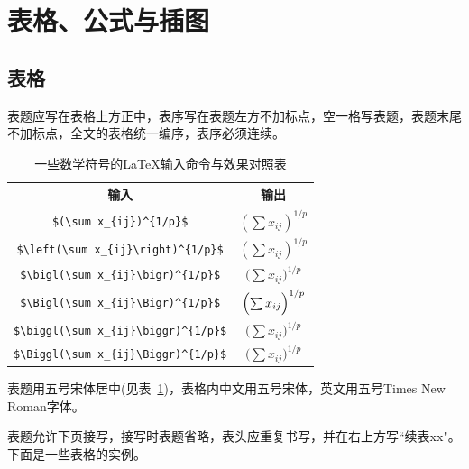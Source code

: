 \section{表格、公式与插图}\label{sec:ssss}
\subsection{表格}



表题应写在表格上方正中，表序写在表题左方不加标点，空一格写表题，表题末尾不加标点，全文的表格统一编序，表序必须连续。
\begin{table}[h]
  \centering
  \caption{一些数学符号的{\LaTeX}输入命令与效果对照表}\label{table:1}
  \begin{tabular}{|c|c|}\hline
  输入 & 输出 \\\hline
  \verb=$(\sum x_{ij})^{1/p}$= & $(\sum x_{ij})^{1/p}$ \\\hline
  \verb=$\left(\sum x_{ij}\right)^{1/p}$= & $\left(\sum x_{ij}\right)^{1/p}$ \\\hline
  \verb=$\bigl(\sum x_{ij}\bigr)^{1/p}$= & $\bigl(\sum x_{ij}\bigr)^{1/p}$ \\\hline
  \verb=$\Bigl(\sum x_{ij}\Bigr)^{1/p}$= & $\Bigl(\sum x_{ij}\Bigr)^{1/p}$ \\\hline
  \verb=$\biggl(\sum x_{ij}\biggr)^{1/p}$= & $\biggl(\sum x_{ij}\biggr)^{1/p}$ \\\hline
  \verb=$\Biggl(\sum x_{ij}\Biggr)^{1/p}$= & $\Biggl(\sum x_{ij}\Biggr)^{1/p}$ \\
  \hline
\end{tabular}
\end{table}
表题用五号宋体居中(见表~\ref{table:1})，表格内中文用五号宋体，英文用五号Times
New Roman字体。

表题允许下页接写，接写时表题省略，表头应重复书写，并在右上方写``续表xx"。下面是一些表格的实例。
%
%
%

